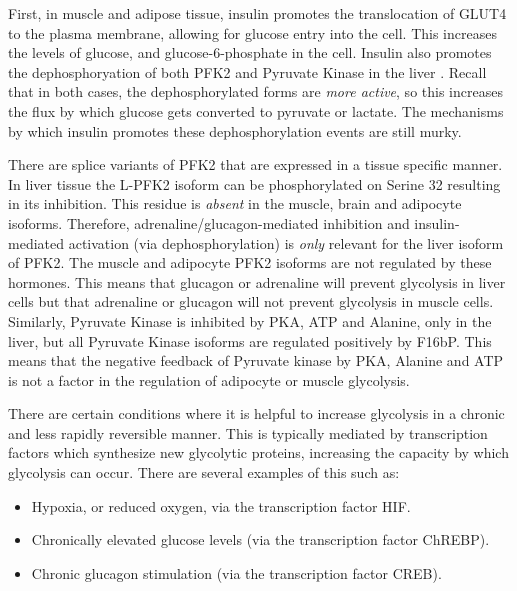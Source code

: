\documentclass{tufte-handout}
\begin{document}
  First, in muscle and adipose tissue, insulin promotes the translocation of GLUT4 to the plasma membrane, allowing for glucose entry into the cell.  This increases the levels of glucose, and glucose-6-phosphate in the cell.  Insulin also promotes the dephosphoryation of both PFK2 and Pyruvate Kinase in the liver \citep{PROBST1985}. Recall that in both cases, the dephosphorylated forms are \emph{more active}, so this increases the flux by which glucose gets converted to pyruvate or lactate.  The mechanisms by which insulin promotes these dephosphorylation events are still murky.

  There are splice variants of PFK2 that are expressed in a tissue specific manner.  In liver tissue the L-PFK2 isoform can be phosphorylated on Serine 32 resulting in its inhibition.  This residue is \emph{absent} in the muscle, brain and adipocyte isoforms.  Therefore, adrenaline/glucagon-mediated inhibition and insulin-mediated activation (via dephosphorylation) is \emph{only} relevant for the liver isoform of PFK2.  The muscle and adipocyte PFK2 isoforms are not regulated by these hormones.  This means that glucagon or adrenaline will prevent glycolysis in liver cells but that adrenaline or glucagon will not prevent glycolysis in muscle cells.  Similarly, Pyruvate Kinase is inhibited by PKA, ATP and Alanine, only in the liver, but all Pyruvate Kinase isoforms are regulated positively by F16bP.  This means that the negative feedback of Pyruvate kinase by PKA, Alanine and ATP is not a factor in the regulation of adipocyte or muscle glycolysis.  

  There are certain conditions where it is helpful to increase glycolysis in a chronic and less rapidly reversible manner.  This is typically mediated by transcription factors which synthesize new glycolytic proteins, increasing the capacity by which glycolysis can occur.  There are several examples of this such as:

\begin{itemize}
\item Hypoxia, or reduced oxygen, via the transcription factor HIF.
\item Chronically elevated glucose levels (via the transcription factor ChREBP).    
\item Chronic glucagon stimulation (via the transcription factor CREB).
\end{itemize}
\end{document}
